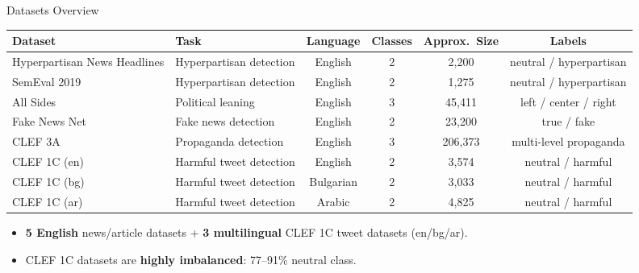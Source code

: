 \documentclass[aspectratio=169]{beamer}
\begin{document}
\begin{frame}{Datasets Overview}
  \begin{table}
    \centering
    \scriptsize
    \begin{adjustbox}{max width=\textwidth}
    \begin{tabular}{llcccc}
      \toprule
      \textbf{Dataset} & \textbf{Task} & \textbf{Language} & \textbf{Classes} & \textbf{Approx.\ Size} & \textbf{Labels} \\
      \midrule
      Hyperpartisan News Headlines & Hyperpartisan detection & English    & 2 & 2,200   & neutral / hyperpartisan \\
      SemEval 2019                 & Hyperpartisan detection & English    & 2 & 1,275   & neutral / hyperpartisan \\
      All Sides                    & Political leaning       & English    & 3 & 45,411  & left / center / right \\
      Fake News Net                & Fake news detection     & English    & 2 & 23,200  & true / fake \\
      CLEF 3A                      & Propaganda detection    & English    & 3 & 206,373 & multi-level propaganda \\
      \midrule
      CLEF 1C (en)                 & Harmful tweet detection & English    & 2 & 3,574   & neutral / harmful \\
      CLEF 1C (bg)                 & Harmful tweet detection & Bulgarian  & 2 & 3,033   & neutral / harmful \\
      CLEF 1C (ar)                 & Harmful tweet detection & Arabic     & 2 & 4,825   & neutral / harmful \\
      \bottomrule
    \end{tabular}
    \end{adjustbox}
  \end{table}

  \vspace{0.15cm}
  \begin{itemize}
    \item \textbf{5 English} news/article datasets + \textbf{3 multilingual} CLEF 1C tweet datasets (en/bg/ar).
    \item CLEF 1C datasets are \textbf{highly imbalanced}: 77--91\% neutral class.
  \end{itemize}
\end{frame}

\end{document}
